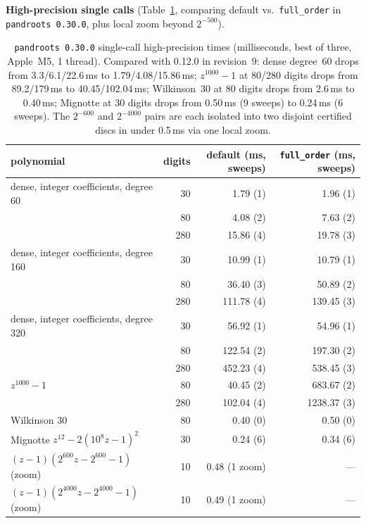 \documentclass[10pt,a4paper]{article}
\theoremstyle{definition}
\numberwithin{equation}{section}
\begin{document}
\textbf{High-precision single calls} (Table~\ref{tab:hp}, comparing default vs.\ \texttt{full\_order} in \texttt{pandroots 0.30.0}, plus local zoom beyond $2^{-500}$).

\begin{table}[H]\centering\small
\begin{tabular}{lrrr}
\toprule
polynomial & digits & default (ms, sweeps) & \texttt{full\_order} (ms, sweeps)\\
\midrule
dense, integer coefficients, degree 60  &  30 &   1.79 (1) &   1.96 (1)\\
                                        &  80 &   4.08 (2) &   7.63 (2)\\
                                        & 280 &  15.86 (4) &  19.78 (3)\\
dense, integer coefficients, degree 160 &  30 &  10.99 (1) &  10.79 (1)\\
                                        &  80 &  36.40 (3) &  50.89 (2)\\
                                        & 280 & 111.78 (4) & 139.45 (3)\\
dense, integer coefficients, degree 320 &  30 &  56.92 (1) &  54.96 (1)\\
                                        &  80 & 122.54 (2) & 197.30 (2)\\
                                        & 280 & 452.23 (4) & 538.45 (3)\\
$z^{1000}-1$                            &  80 &  40.45 (2) & 683.67 (2)\\
                                        & 280 & 102.04 (4) & 1238.37 (3)\\
Wilkinson 30                            &  80 &   0.40 (0) &   0.50 (0)\\
Mignotte $z^{12}-2(10^8 z-1)^2$         &  30 &   0.24 (6) &   0.34 (6)\\
$(z-1)(2^{600}z-2^{600}-1)$ (zoom)      &  10 &   0.48 (1 zoom) & ---\\
$(z-1)(2^{4000}z-2^{4000}-1)$ (zoom)    &  10 &   0.49 (1 zoom) & ---\\
\bottomrule
\end{tabular}
\caption{\texttt{pandroots 0.30.0} single-call high-precision times (milliseconds, best of three, Apple~M5, 1 thread). Compared with 0.12.0 in revision~9: dense degree~60 drops from 3.3/6.1/22.6\,ms to 1.79/4.08/15.86\,ms; $z^{1000}-1$ at 80/280 digits drops from 89.2/179\,ms to 40.45/102.04\,ms; Wilkinson~30 at 80 digits drops from 2.6\,ms to 0.40\,ms; Mignotte at 30 digits drops from 0.50\,ms (9 sweeps) to 0.24\,ms (6 sweeps). The $2^{-600}$ and $2^{-4000}$ pairs are each isolated into two disjoint certified discs in under 0.5\,ms via one local zoom.}\label{tab:hp}
\end{table}
\end{document}
